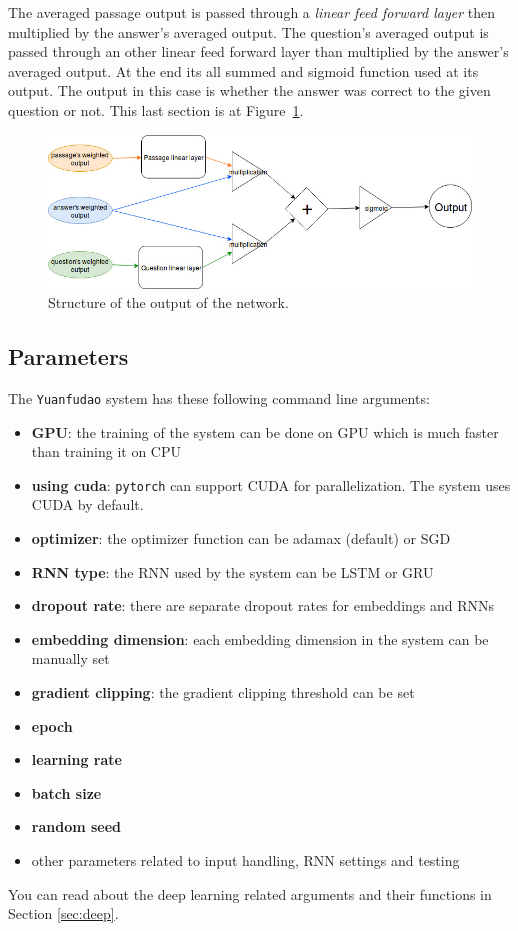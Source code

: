 The averaged passage output is passed through a \textit{linear feed forward layer} then multiplied by the answer's averaged output. The question's averaged output is passed through an other linear feed forward layer than multiplied by the answer's averaged output. At the end its all summed and sigmoid function used at its output. The output in this case is whether the answer was correct to the given question or not. This last section is at Figure~\ref{fig:output}.
\begin{figure}[!htb]
	\centering
	\includegraphics[scale=0.5]{figures/TriAN_output.jpg}
	\caption{Structure of the output of the network.}
	\label{fig:output}
\end{figure}


\subsection{Parameters}
\begin{minipage}{\textwidth}
	The \texttt{Yuanfudao} system has these following command line arguments:
	\begin{itemize}
		\item \textbf{GPU}: the training of the system can be done on GPU which is much faster than training it on CPU
		\item \textbf{using cuda}: \texttt{pytorch} can support CUDA for parallelization. The system uses CUDA by default.
		\item \textbf{optimizer}: the optimizer function can be adamax (default) or SGD
		\item \textbf{RNN type}: the RNN used by the system can be LSTM or GRU
		\item \textbf{dropout rate}: there are separate dropout rates for embeddings and RNNs
		\item \textbf{embedding dimension}: each embedding dimension in the system can be manually set
		\item \textbf{gradient clipping}: the gradient clipping threshold can be set
		\item \textbf{epoch}
		\item \textbf{learning rate}
		\item \textbf{batch size}
		\item \textbf{random seed}
		\item other parameters related to input handling, RNN settings and testing
	\end{itemize}
	You can read about the deep learning related arguments and their functions in Section \ref{sec:deep}.
\end{minipage}

